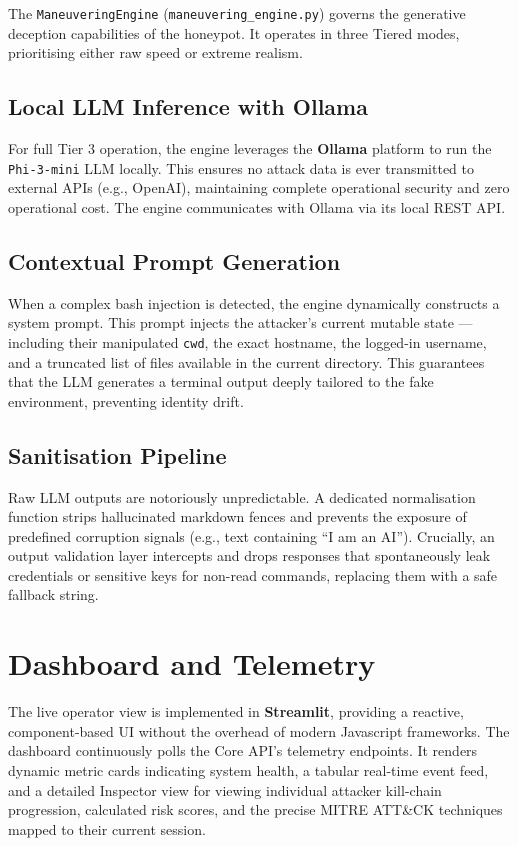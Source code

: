The \texttt{ManeuveringEngine} (\texttt{maneuvering\_engine.py}) governs the generative deception capabilities of the honeypot. It operates in three Tiered modes, prioritising either raw speed or extreme realism.

\subsection{Local LLM Inference with Ollama}
For full Tier 3 operation, the engine leverages the \textbf{Ollama} platform to run the \texttt{Phi-3-mini} LLM locally. This ensures no attack data is ever transmitted to external APIs (e.g., OpenAI), maintaining complete operational security and zero operational cost. The engine communicates with Ollama via its local REST API.

\subsection{Contextual Prompt Generation}
When a complex bash injection is detected, the engine dynamically constructs a system prompt. This prompt injects the attacker's current mutable state — including their manipulated \texttt{cwd}, the exact hostname, the logged-in username, and a truncated list of files available in the current directory. This guarantees that the LLM generates a terminal output deeply tailored to the fake environment, preventing identity drift.

\subsection{Sanitisation Pipeline}
Raw LLM outputs are notoriously unpredictable. A dedicated normalisation function strips hallucinated markdown fences and prevents the exposure of predefined corruption signals (e.g., text containing ``I am an AI''). Crucially, an output validation layer intercepts and drops responses that spontaneously leak credentials or sensitive keys for non-read commands, replacing them with a safe fallback string.

\section{Dashboard and Telemetry}

The live operator view is implemented in \textbf{Streamlit}, providing a reactive, component-based UI without the overhead of modern Javascript frameworks.
The dashboard continuously polls the Core API's telemetry endpoints. It renders dynamic metric cards indicating system health, a tabular real-time event feed, and a detailed Inspector view for viewing individual attacker kill-chain progression, calculated risk scores, and the precise MITRE ATT\&CK techniques mapped to their current session.

